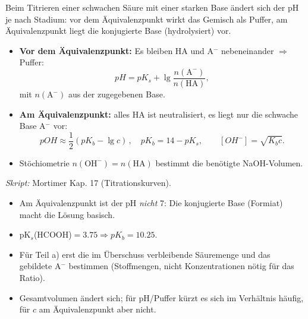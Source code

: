 

Beim Titrieren einer schwachen Säure mit einer starken Base ändert sich der
pH je nach Stadium: vor dem Äquivalenzpunkt wirkt das Gemisch als Puffer,
am Äquivalenzpunkt liegt die konjugierte Base (hydrolysiert) vor.

\begin{werkzeugkasten}
\begin{itemize}
  \item \textbf{Vor dem Äquivalenzpunkt:} Es bleiben HA und A$^-$
        nebeneinander $\Rightarrow$ Puffer:
        \[
          pH = pK_s + \lg\frac{n(\mathrm{A^-})}{n(\mathrm{HA})},
        \]
        mit $n(\mathrm{A^-})$ aus der zugegebenen Base.
  \item \textbf{Am Äquivalenzpunkt:} alles HA ist neutralisiert, es liegt
        nur die schwache Base A$^-$ vor:
        \[
          pOH \approx \frac12(pK_b - \lg c)\,,\quad
          pK_b = 14-pK_s,\qquad [OH^-] = \sqrt{K_b c}.
        \]
  \item Stöchiometrie $n(\mathrm{OH^-})=n(\mathrm{HA})$ bestimmt die
        benötigte NaOH-Volumen.
\end{itemize}
\textit{Skript:} Mortimer Kap. 17 (Titrationskurven).
\end{werkzeugkasten}

\begin{achtung}
\begin{itemize}
  \item Am Äquivalenzpunkt ist der pH \emph{nicht} 7: Die konjugierte Base
        (Formiat) macht die Lösung basisch.
  \item pK$_s$(HCOOH)$=3.75 \Rightarrow pK_b=10.25$.
  \item Für Teil a) erst die im Überschuss verbleibende Säuremenge und das
        gebildete A$^-$ bestimmen (Stoffmengen, nicht Konzentrationen nötig
        für das Ratio).
  \item Gesamtvolumen ändert sich; für pH/Puffer kürzt es sich im
        Verhältnis häufig, für $c$ am Äquivalenzpunkt aber nicht.
\end{itemize}
\end{achtung}
